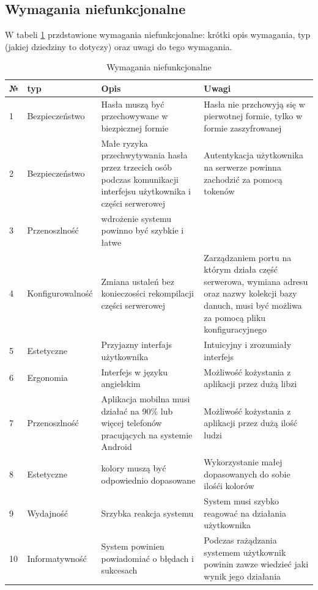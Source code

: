 \subsection{Wymagania niefunkcjonalne}
W tabeli \ref{tab:wymaganianiefunkcjonalne} przdstawione wymagania niefunkcjonalne: krótki opis wymagania, typ (jakiej dziedziny to dotyczy) oraz uwagi do tego wymagania.
\begin{table}[htb] \small
    \caption{Wymagania niefunkcjonalne}
    \label{tab:wymaganianiefunkcjonalne}
    \begin{tabular}{| m{0.5cm} | m{3cm} | m{5.75cm} | m{5.75cm} |} 
    \hline
    № & typ & Opis & Uwagi \\
    \hline
    1 & Bezpieczeństwo & Hasła muszą być przechowywane w biezpicznej formie & Hasła nie przchowyją się w pierwotnej formie, tylko w formie zaszyfrowanej \\ 
    \hline
    2 & Bezpieczeństwo & Małe ryzyka przechwytywania hasła przez trzecich osób podczas komunikacji interfejsu użytkownika i części serwerowej & Autentykacja użytkownika na serwerze powinna zachodzić za pomocą tokenów \\ 
    \hline
    3 & Przenoszlność & wdrożenie systemu powinno być szybkie i łatwe & \\ 
    \hline
    4 & Konfigurowalność & Zmiana ustaleń bez konieczosści rekompilacji części serwerowej & Zarządzaniem portu na którym działa część serwerowa, wymiana adresu oraz nazwy kolekcji bazy danuch, musi być możliwa za pomocą pliku konfiguracyjnego \\ 
    \hline
    5 & Estetyczne & Przyjazny interfajs użytkownika & Intuicyjny i zrozumiały interfejs \\ 
    \hline
    6 & Ergonomia & Interfejs w języku angielskim & Możliwość kożystania z aplikacji przez dużą libzi \\
    \hline
    7 & Przenoszlność & Aplikacja mobilna musi działać na 90\% lub więcej telefonów pracujących na systemie Android & Możliwość kożystania z aplikacji przez dużą ilość ludzi \\
    \hline
    8 & Estetyczne & kolory muszą być odpowiednio dopasowane & Wykorzystanie małej dopasowanych do sobie ilośći kolorów  \\
    \hline
    9 & Wydajność & Srzybka reakcja systemu & System musi szybko reagować na działania użytkownika \\
    \hline
    10 & Informatywność & System powinien powiadomiać o błędach i sukcesach  & Podczas rażądzania systemem użytkownik powinin zawze wiedzieć jaki wynik jego działania \\

\end{tabular}
\end{table}
